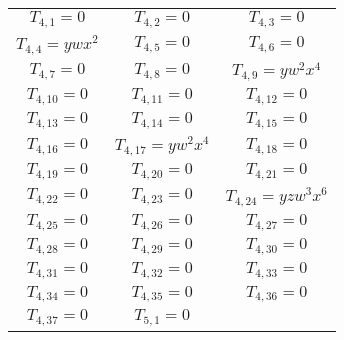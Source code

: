 \documentclass[12pt]{memoireuqam1.3}
\begin{document}
\begin{longtable}{|c|c|c|}
$T_{4,1}= 0$&

$T_{4,2}= 0$&

$T_{4,3}= 0$\\

$T_{4,4}= ywx^2$&

$T_{4,5}= 0$&

$T_{4,6}= 0$\\

$T_{4,7}= 0$&

$T_{4,8}= 0$&

$T_{4,9}= yw^2x^4$\\

$T_{4,10}= 0$&

$T_{4,11}= 0$&

$T_{4,12}= 0$\\

$T_{4,13}= 0$&

$T_{4,14}= 0$&

$T_{4,15}= 0$\\

$T_{4,16}= 0$&

$T_{4,17}= yw^2x^4$&

$T_{4,18}= 0$\\

$T_{4,19}= 0$&

$T_{4,20}= 0$&

$T_{4,21}= 0$\\

$T_{4,22}= 0$&

$T_{4,23}= 0$&

$T_{4,24}= yzw^3x^6$\\

$T_{4,25}= 0$&

$T_{4,26}= 0$&

$T_{4,27}= 0$\\

$T_{4,28}= 0$&

$T_{4,29}= 0$&

$T_{4,30}= 0$\\

$T_{4,31}= 0$&

$T_{4,32}= 0$&

$T_{4,33}= 0$\\

$T_{4,34}= 0$&

$T_{4,35}= 0$&

$T_{4,36}= 0$\\

$T_{4,37}= 0$&

$T_{5,1}= 0$&


\end{longtable}
\end{document}
